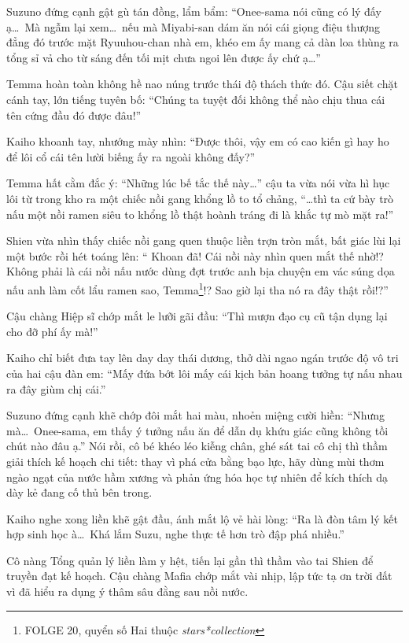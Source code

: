 \documentclass[../main.tex]{subfiles}
\begin{document}
Suzuno đứng cạnh gật gù tán đồng, lẩm bẩm: ``Onee-sama nói cũng có lý đấy ạ\dots\ Mà ngẫm lại xem\dots\ nếu mà Miyabi-san dám ăn nói cái giọng điệu thượng đẳng đó trước mặt Ryuuhou-chan nhà em, khéo em ấy mang cả dàn loa thùng ra tổng sỉ vả cho từ sáng đến tối mịt chưa ngoi lên được ấy chứ ạ\dots''

Temma hoàn toàn không hề nao núng trước thái độ thách thức đó. Cậu siết chặt cánh tay, lớn tiếng tuyên bố: ``Chúng ta tuyệt đối không thể nào chịu thua cái tên cứng đầu đó được đâu!''

Kaiho khoanh tay, nhướng mày nhìn: ``Được thôi, vậy em có cao kiến gì hay ho để lôi cổ cái tên lười biếng ấy ra ngoài không đấy?''

Temma hất cằm đắc ý: ``Những lúc bế tắc thế này\dots'' cậu ta vừa nói vừa hì hục lôi từ trong kho ra một chiếc nồi gang khổng lồ to tổ chảng, ``\dots thì ta cứ bày trò nấu một nồi ramen siêu to khổng lồ thật hoành tráng đi là khắc tự mò mặt ra!''


Shien vừa nhìn thấy chiếc nồi gang quen thuộc liền trợn tròn mắt, bất giác lùi lại một bước rồi hét toáng lên: `` Khoan đã! Cái nồi này nhìn quen mắt thế nhờ!? Không phải là cái nồi nấu nước dùng đợt trước anh bịa chuyện em vác súng dọa nấu anh làm cốt lẩu ramen sao, Temma\footnote{{\humanist FOLGE 20}, quyển số Hai thuộc \textit{stars*collection}}!? Sao giờ lại tha nó ra đây thật rồi!?''

Cậu chàng Hiệp sĩ chớp mắt le lưỡi gãi đầu: ``Thì mượn đạo cụ cũ tận dụng lại cho đỡ phí ấy mà!''

Kaiho chỉ biết đưa tay lên day day thái dương, thở dài ngao ngán trước độ vô tri của hai cậu đàn em: ``Mấy đứa bớt lôi mấy cái kịch bản hoang tưởng tự nấu nhau ra đây giùm chị cái.''

Suzuno đứng cạnh khẽ chớp đôi mắt hai màu, nhoẻn miệng cười hiền: ``Nhưng mà\dots\ Onee-sama, em thấy ý tưởng nấu ăn để dẫn dụ khứu giác cũng không tồi chút nào đâu ạ.'' Nói rồi, cô bé khéo léo kiễng chân, ghé sát tai cô chị thì thầm giải thích kế hoạch chi tiết: thay vì phá cửa bằng bạo lực, hãy dùng mùi thơm ngào ngạt của nước hầm xương và phản ứng hóa học tự nhiên để kích thích dạ dày kẻ đang cố thủ bên trong.

Kaiho nghe xong liền khẽ gật đầu, ánh mắt lộ vẻ hài lòng: ``Ra là đòn tâm lý kết hợp sinh học à\dots\ Khá lắm Suzu, nghe thực tế hơn trò đập phá nhiều.''

Cô nàng Tổng quản lý liền làm y hệt, tiến lại gần thì thầm vào tai Shien để truyền đạt kế hoạch. Cậu chàng Mafia chớp mắt vài nhịp, lập tức tạ ơn trời đất vì đã hiểu ra dụng ý thâm sâu đằng sau nồi nước.
\end{document}
